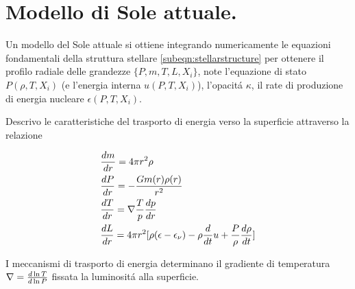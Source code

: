 \documentclass[../main.tex]{subfiles}
\begin{document}
\begin{minipage}{\linewidth}
\end{minipage}



\section{Modello di Sole attuale.}

Un modello del Sole attuale si ottiene integrando numericamente le equazioni fondamentali della struttura stellare \eqref{subeqn:stellarstructure} per ottenere il profilo radiale delle grandezze $\{P,m,T,L,X_i\}$, note  l'equazione di stato $P(\rho,T,X_i)$ (e l'energia interna $u(P,T,X_i)$), l'opacit\'a $\kappa$, il rate di produzione di energia nucleare $\epsilon(P,T,X_i)$.

Descrivo le caratteristiche del trasporto di energia verso la superficie attraverso la relazione

\begin{subequations}\label{subeqn:stellarstructure}
\begin{align}
&\TDy{r}{m}=4\pi r^2\rho\\
&\TDy{r}{P}=-\frac{Gm(r)\rho(r)}{r^2}\\
&\TDy{r}{T}=\nabla\frac{T}{p}\TDy{r}{p}\\
&\TDy{r}{L}=4\pi r^2[\rho(\epsilon-\epsilon_{\nu})-\rho\TDof{t}u+\frac{P}{\rho}\TDy{t}{\rho}]
\end{align}
\end{subequations}

I meccanismi di trasporto di energia determinano il gradiente di temperatura $\nabla=\TDly{P}{T}$ fissata la luminosit\'a alla superficie.
\end{document}
